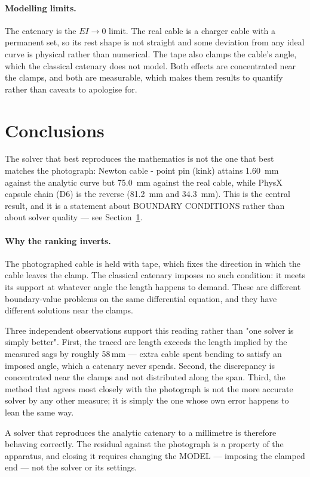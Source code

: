 \documentclass[11pt,a4paper]{article}
\begin{document}
\paragraph{Modelling limits.} The catenary is the $EI \to 0$ limit. The real
cable is a charger cable with a permanent set, so its rest shape is not
straight and some deviation from any ideal curve is physical rather than
numerical. The tape also clamps the cable's angle, which the classical
catenary does not model. Both effects are concentrated near the clamps, and
both are measurable, which makes them results to quantify rather than caveats
to apologise for.

\section{Conclusions}
\label{sec:conclusions}

The solver that best reproduces the mathematics is not the one that best matches the photograph: Newton cable - point pin (kink) attains 1.60~mm against the analytic curve but 75.0~mm against the real cable, while PhysX capsule chain (D6) is the reverse (81.2~mm and 34.3~mm). This is the central result, and it is a statement about BOUNDARY CONDITIONS rather than about solver quality --- see Section~\ref{sec:conclusions}.

\paragraph{Why the ranking inverts.} The photographed cable is held with
tape, which fixes the direction in which the cable leaves the clamp. The
classical catenary imposes no such condition: it meets its support at whatever
angle the length happens to demand. These are different boundary-value
problems on the same differential equation, and they have different solutions
near the clamps.

Three independent observations support this reading rather than "one solver is
simply better". First, the traced arc length exceeds the length implied by the
measured sags by roughly 58\,mm --- extra cable spent bending to satisfy an
imposed angle, which a catenary never spends. Second, the discrepancy is
concentrated near the clamps and not distributed along the span. Third, the
method that agrees most closely with the photograph is not the more accurate
solver by any other measure; it is simply the one whose own error happens to
lean the same way.

A solver that reproduces the analytic catenary to a millimetre is therefore
behaving correctly. The residual against the photograph is a property of the
apparatus, and closing it requires changing the MODEL --- imposing the clamped
end --- not the solver or its settings.
\end{document}
